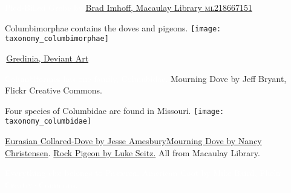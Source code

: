 \documentclass[t]{beamer}
\begin{document}
{
\begin{frame}[b]


	\tinyfill \textcolor{white}{Pied-Billed Grebe by  \href{https://macaulaylibrary.org/asset/218667151}{Brad Imhoff, Macaulay Library \textsc{ml218667151}}}
\end{frame}
}


\begin{frame}[t]{Columbimorphae contains the doves and pigeons.}
\centering
\texttt{[image: taxonomy\_columbimorphae]}

\vfilll

\tinyfill \textcopyright\,\href{https://www.deviantart.com/gredinia/art/Bird-cladistic-Columbimorphae-diversity-705097984}{Gredinia, Deviant Art}
\end{frame}




{
\begin{frame}[b,plain]{\textcolor{white}{Columbiformes has one family, \textcolor{orange4}{Columbidae.}}}
	\tiny\hfill Mourning Dove by Jeff Bryant, Flickr Creative Commons.
\end{frame}
}

\begin{frame}[t]{Four species of Columbidae are found in Missouri.}
\vspace{-0.5\baselineskip}
\centering
\texttt{[image: taxonomy\_columbidae]}

\vfilll

\tiny \href{https://macaulaylibrary.org/asset/45325741}{Eurasian Collared-Dove by Jesse Amesbury}\hfill \href{https://macaulaylibrary.org/asset/50824121}{Mourning Dove by Nancy Christensen}. \hfill \href{https://macaulaylibrary.org/asset/61674401}{Rock Pigeon by Luke Seitz.}  All from Macaulay Library.
\end{frame}

{
\begin{frame}[b,plain]{\hfill\textcolor{white}{Everything else belongs to Passerea.}}
	\tiny\textcolor{white}{American Coot by Mike Baird, Flickr Creative Commons.}
\end{frame}
}
\end{document}
